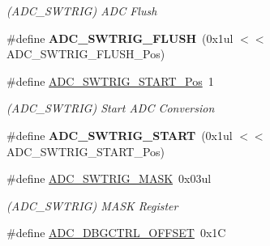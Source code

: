 \begin{DoxyCompactItemize}
\begin{DoxyCompactList}\small\item\em (A\+D\+C\+\_\+\+S\+W\+T\+R\+I\+G) A\+D\+C Flush \end{DoxyCompactList}\item 
\hypertarget{group___s_a_m_l21___a_d_c_ga0fda4b567d2d9486ebd8ea6d2674f76c}{}\#define {\bfseries A\+D\+C\+\_\+\+S\+W\+T\+R\+I\+G\+\_\+\+F\+L\+U\+S\+H}~(0x1ul $<$$<$ A\+D\+C\+\_\+\+S\+W\+T\+R\+I\+G\+\_\+\+F\+L\+U\+S\+H\+\_\+\+Pos)\label{group___s_a_m_l21___a_d_c_ga0fda4b567d2d9486ebd8ea6d2674f76c}

\item 
\hypertarget{group___s_a_m_l21___a_d_c_ga12409e6821f87b501654671ff5dcae55}{}\#define \hyperlink{group___s_a_m_l21___a_d_c_ga12409e6821f87b501654671ff5dcae55}{A\+D\+C\+\_\+\+S\+W\+T\+R\+I\+G\+\_\+\+S\+T\+A\+R\+T\+\_\+\+Pos}~1\label{group___s_a_m_l21___a_d_c_ga12409e6821f87b501654671ff5dcae55}

\begin{DoxyCompactList}\small\item\em (A\+D\+C\+\_\+\+S\+W\+T\+R\+I\+G) Start A\+D\+C Conversion \end{DoxyCompactList}\item 
\hypertarget{group___s_a_m_l21___a_d_c_ga6a130ae4352fc4bbe067d43950cb485d}{}\#define {\bfseries A\+D\+C\+\_\+\+S\+W\+T\+R\+I\+G\+\_\+\+S\+T\+A\+R\+T}~(0x1ul $<$$<$ A\+D\+C\+\_\+\+S\+W\+T\+R\+I\+G\+\_\+\+S\+T\+A\+R\+T\+\_\+\+Pos)\label{group___s_a_m_l21___a_d_c_ga6a130ae4352fc4bbe067d43950cb485d}

\item 
\hypertarget{group___s_a_m_l21___a_d_c_ga03f8a2bcff30a481d12adb178c1104f0}{}\#define \hyperlink{group___s_a_m_l21___a_d_c_ga03f8a2bcff30a481d12adb178c1104f0}{A\+D\+C\+\_\+\+S\+W\+T\+R\+I\+G\+\_\+\+M\+A\+S\+K}~0x03ul\label{group___s_a_m_l21___a_d_c_ga03f8a2bcff30a481d12adb178c1104f0}

\begin{DoxyCompactList}\small\item\em (A\+D\+C\+\_\+\+S\+W\+T\+R\+I\+G) M\+A\+S\+K Register \end{DoxyCompactList}\item 
\hypertarget{group___s_a_m_l21___a_d_c_ga4e4a609b23ab0bec015d436e2abf67fe}{}\#define \hyperlink{group___s_a_m_l21___a_d_c_ga4e4a609b23ab0bec015d436e2abf67fe}{A\+D\+C\+\_\+\+D\+B\+G\+C\+T\+R\+L\+\_\+\+O\+F\+F\+S\+E\+T}~0x1\+C\label{group___s_a_m_l21___a_d_c_ga4e4a609b23ab0bec015d436e2abf67fe}


\end{DoxyCompactItemize}
